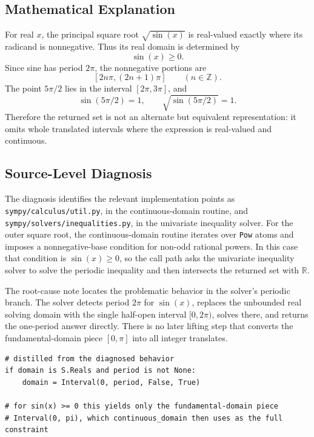 \documentclass[11pt]{article}
\begin{document}
\subsection{Mathematical Explanation}

For real \(x\), the principal square root \(\sqrt{\sin(x)}\) is real-valued
exactly where its radicand is nonnegative. Thus its real domain is determined
by
\[
  \sin(x)\geq 0.
\]
Since sine has period \(2\pi\), the nonnegative portions are
\[
  [2n\pi,(2n+1)\pi]\qquad(n\in\mathbb{Z}).
\]
The point \(5\pi/2\) lies in the interval \([2\pi,3\pi]\), and
\[
  \sin(5\pi/2)=1,\qquad \sqrt{\sin(5\pi/2)}=1.
\]
Therefore the returned set is not an alternate but equivalent representation:
it omits whole translated intervals where the expression is real-valued and
continuous.

\subsection{Source-Level Diagnosis}

The diagnosis identifies the relevant implementation points as
\nolinkurl{sympy/calculus/util.py}, in the continuous-domain routine, and
\nolinkurl{sympy/solvers/inequalities.py}, in the univariate inequality solver.
For the outer square root, the continuous-domain routine iterates over
\texttt{Pow} atoms and imposes a
nonnegative-base condition for non-odd rational powers. In this case that
condition is \(\sin(x)\geq 0\), so the call path asks the univariate inequality
solver to solve the periodic inequality and then intersects the returned set
with \(\mathbb{R}\).

The root-cause note locates the problematic behavior in the solver's periodic
branch. The solver detects period \(2\pi\) for \(\sin(x)\), replaces the
unbounded real solving domain with the single half-open interval \([0,2\pi)\),
solves there, and returns the one-period answer directly. There is no later
lifting step that converts the fundamental-domain piece \([0,\pi]\) into all
integer translates.

\begin{lstlisting}[style=bugpython]
# distilled from the diagnosed behavior
if domain is S.Reals and period is not None:
    domain = Interval(0, period, False, True)

# for sin(x) >= 0 this yields only the fundamental-domain piece
# Interval(0, pi), which continuous_domain then uses as the full constraint
\end{lstlisting}
\end{document}
